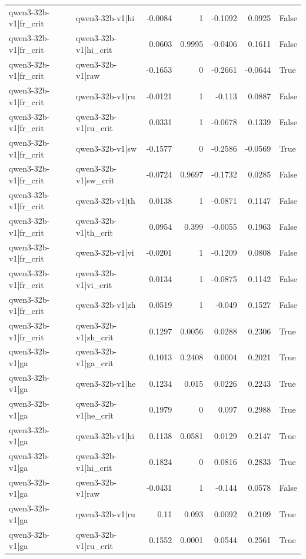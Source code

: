 \begin{table}
\begin{tabular}{l l r r r r l}
qwen3-32b-v1|fr_crit & qwen3-32b-v1|hi & -0.0084 & 1 & -0.1092 & 0.0925 & False \\
qwen3-32b-v1|fr_crit & qwen3-32b-v1|hi_crit & 0.0603 & 0.9995 & -0.0406 & 0.1611 & False \\
qwen3-32b-v1|fr_crit & qwen3-32b-v1|raw & -0.1653 & 0 & -0.2661 & -0.0644 & True \\
qwen3-32b-v1|fr_crit & qwen3-32b-v1|ru & -0.0121 & 1 & -0.113 & 0.0887 & False \\
qwen3-32b-v1|fr_crit & qwen3-32b-v1|ru_crit & 0.0331 & 1 & -0.0678 & 0.1339 & False \\
qwen3-32b-v1|fr_crit & qwen3-32b-v1|sw & -0.1577 & 0 & -0.2586 & -0.0569 & True \\
qwen3-32b-v1|fr_crit & qwen3-32b-v1|sw_crit & -0.0724 & 0.9697 & -0.1732 & 0.0285 & False \\
qwen3-32b-v1|fr_crit & qwen3-32b-v1|th & 0.0138 & 1 & -0.0871 & 0.1147 & False \\
qwen3-32b-v1|fr_crit & qwen3-32b-v1|th_crit & 0.0954 & 0.399 & -0.0055 & 0.1963 & False \\
qwen3-32b-v1|fr_crit & qwen3-32b-v1|vi & -0.0201 & 1 & -0.1209 & 0.0808 & False \\
qwen3-32b-v1|fr_crit & qwen3-32b-v1|vi_crit & 0.0134 & 1 & -0.0875 & 0.1142 & False \\
qwen3-32b-v1|fr_crit & qwen3-32b-v1|zh & 0.0519 & 1 & -0.049 & 0.1527 & False \\
qwen3-32b-v1|fr_crit & qwen3-32b-v1|zh_crit & 0.1297 & 0.0056 & 0.0288 & 0.2306 & True \\
qwen3-32b-v1|ga & qwen3-32b-v1|ga_crit & 0.1013 & 0.2408 & 0.0004 & 0.2021 & True \\
qwen3-32b-v1|ga & qwen3-32b-v1|he & 0.1234 & 0.015 & 0.0226 & 0.2243 & True \\
qwen3-32b-v1|ga & qwen3-32b-v1|he_crit & 0.1979 & 0 & 0.097 & 0.2988 & True \\
qwen3-32b-v1|ga & qwen3-32b-v1|hi & 0.1138 & 0.0581 & 0.0129 & 0.2147 & True \\
qwen3-32b-v1|ga & qwen3-32b-v1|hi_crit & 0.1824 & 0 & 0.0816 & 0.2833 & True \\
qwen3-32b-v1|ga & qwen3-32b-v1|raw & -0.0431 & 1 & -0.144 & 0.0578 & False \\
qwen3-32b-v1|ga & qwen3-32b-v1|ru & 0.11 & 0.093 & 0.0092 & 0.2109 & True \\
qwen3-32b-v1|ga & qwen3-32b-v1|ru_crit & 0.1552 & 0.0001 & 0.0544 & 0.2561 & True \\

\end{tabular}
\end{table}
